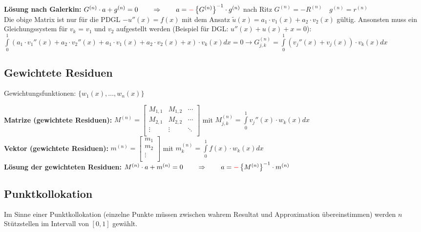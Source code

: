 \textbf{Lösung nach Galerkin:} $G^{(n)}\cdot a+g^{(n)}=0\qquad \Rightarrow
\qquad a=\textcolor{red}{\mathbf{-}}\left\{G^{(n)}\right\}^{-1}\cdot g^{(n)}$ \quad nach Ritz $G^{(n)} = -R^{(n)} \quad g^{(n)} = r^{(n)}$\\

Die obige Matrix ist nur für die PDGL $-u''(x) = f(x)$ mit dem Ansatz
$\tilde{u}(x) = a_1 \cdot v_1(x) + a_2 \cdot v_2(x)$ gültig. Ansonsten muss ein
Gleichungssystem für $v_k$ = $v_1$ und $v_2$ aufgestellt werden (Beispiel
für DGL: $u''(x) + u(x) + x = 0$):\\
$\int\limits_{0}^{1}{(a_1 \cdot v_1''(x) + a_2 \cdot v_2''(x) + a_1 \cdot
v_1(x) + a_2 \cdot v_2(x) + x) \cdot v_k(x) dx} = 0 \rightarrow G_{j,k}^{(n)}=\int\limits_{0}^{1}(v_j''(x) + v_j(x))\cdot v_k(x) dx$

\subsection{Gewichtete Residuen}
Gewichtungsfunktionen: $\{w_1(x),\ldots,w_n(x)\}$

\textbf{Matrize (gewichtete Residuen): }
$M^{(n)}=\begin{bmatrix}
	M_{1,1}& M_{1,2}&\cdots\\
	M_{2,1}& M_{2,2}&\cdots\\
	\vdots & \vdots &\ddots\\
\end{bmatrix}$ \qquad mit \qquad $M_{j,k}^{(n)}=\int\limits_{0}^{1}{v_j''(x)\cdot w_k(x) dx}$\\
\textbf{Vektor (gewichtete Residuen): } 
$m^{(n)}=\begin{bmatrix}
	m_1\\
	m_2\\
	\vdots\\
\end{bmatrix}$ \qquad mit \qquad $m_{k}^{(n)}=\int\limits_{0}^{1}{f(x)\cdot w_k(x) dx}$\\

\textbf{Lösung der gewichteten Residuen:} $M^{(n)}\cdot a+m^{(n)}=0\qquad \Rightarrow \qquad a=\textcolor{red}{\mathbf{-}}\left\{M^{(n)}\right\}^{-1}\cdot m^{(n)}$

\subsection{Punktkollokation}
Im Sinne einer Punktkollokation (einzelne Punkte müssen zwischen wahrem Resultat und Approximation übereinstimmen) werden $n$ Stützstellen im Intervall von $[0,1]$ gewählt.\\

